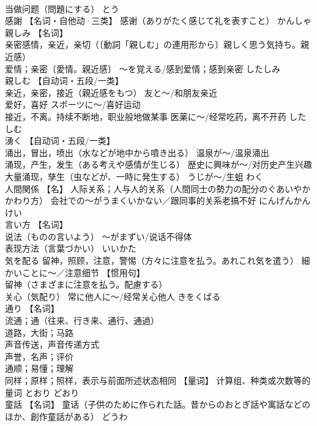 \documentclass[8pt]{extreport}
\begin{document}
\begin{CJK}{UTF8}{min}
\\	当做问题（問題にする）	とう	
\\	感謝	【名词・自他动·三类】 感谢（ありがたく感じて礼を表すこと）	かんしゃ	
\\	親しみ	【名词】 
\\	亲密感情，亲近，亲切（〔動詞「親しむ」の連用形から〕親しく思う気持ち。親近感） 
\\	爱情；亲密〔愛情。親近感〕 ～を覚える/感到爱情；感到亲密	したしみ	
\\	親しむ	【自动词・五段/一类】 
\\	亲近，亲密，接近（親近感をもつ） 友と～/和朋友亲近 
\\	爱好，喜好 スポーツに～/喜好运动 
\\	接近，不离。持续不断地，职业般地做某事 医薬に～/经常吃药，离不开药	したしむ	
\\	湧く	【自动词・五段/一类】 
\\	涌出，冒出，喷出（水などが地中から噴き出る） 温泉が～/温泉涌出 
\\	涌现，产生，发生（ある考えや感情が生じる） 歴史に興味が～/对历史产生兴趣 
\\	大量涌现，孳生（虫などが、一時に発生する） うじが～/生蛆	わく	
\\	人間関係	【名】 人际关系；人与人的关系（人間同士の勢力の配分のぐあいやかかわり方） 会社での～がうまくいかない／跟同事的关系老搞不好	にんげんかんけい	
\\	言い方	【名词】 
\\	说法（ものの言いよう） ～がまずい/说话不得体 
\\	表现方法（言葉づかい）	いいかた	
\\	気を配る	留神，照顾，注意，警惕（方々に注意を払う。あれこれ気を遣う） 細かいことに～／注意细节 【惯用句】 
\\	留神（さまざまに注意を払う。配慮する） 
\\	关心（気配り） 常に他人に～/经常关心他人	きをくばる	
\\	通り	【名词】 
\\	流通；通（往来、行き来、通行、通過） 
\\	道路，大街；马路 
\\	声音传送，声音传递方式 
\\	声誉，名声；评价 
\\	通顺；易懂；理解 
\\	同样；原样；照样，表示与前面所述状态相同 【量词】 计算组、种类或次数等的量词	とおり どおり	
\\	童話	【名词】 童话（子供のために作られた話。昔からのおとぎ話や寓話などのほか、創作童話がある）	どうわ	

\end{CJK}
\end{document}
